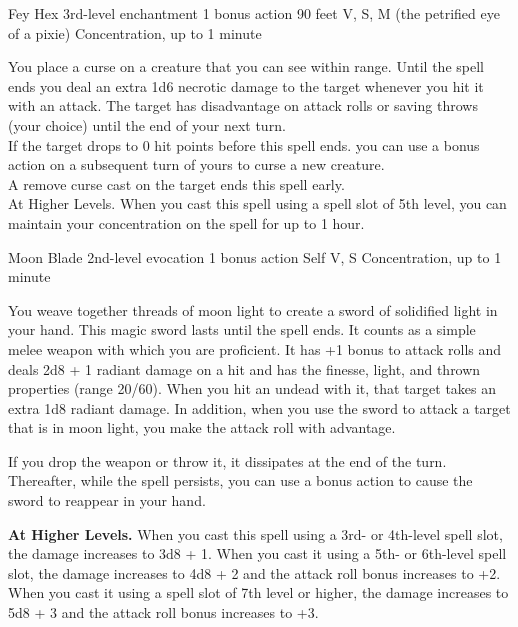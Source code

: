 \documentclass[letter,10pt,twocolumn,openany]{dndbook}
\begin{document}

\DndSpellHeader
  {Fey Hex}
  {3rd-level enchantment}
  {1 bonus action}
  {90 feet}
  {V, S, M (the petrified eye of a pixie)}
  {Concentration, up to 1 minute}

You place a curse on a creature that you can see within range. Until the spell ends you deal an extra 1d6 necrotic damage to the target whenever you hit it with an attack. The target has disadvantage on attack rolls or saving throws (your choice) until the end of your next turn.\\
If the target drops to 0 hit points before this spell ends. you can use a bonus action on a subsequent turn of yours to curse a new creature.\\
A remove curse cast on the target ends this spell early.\\
At Higher Levels. When you cast this spell using a spell slot of 5th level, you can maintain your concentration on the spell for up to 1 hour.

\DndSpellHeader
  {Moon Blade}
  {2nd-level evocation}
  {1 bonus action}
  {Self}
  {V, S}
  {Concentration, up to 1 minute}

You weave together threads of moon light to create a sword of solidified light in your hand. This magic sword lasts until the spell ends. It counts as a simple melee weapon with which you are proficient. It has +1 bonus to attack rolls and deals 2d8 + 1 radiant damage on a hit and has the finesse, light, and thrown properties (range 20/60). When you hit an undead with it, that target takes an extra 1d8 radiant damage. In addition, when you use the sword to attack a target that is in moon light, you make the attack roll with advantage.

If you drop the weapon or throw it, it dissipates at the end of the turn. Thereafter, while the spell persists, you can use a bonus action to cause the sword to reappear in your hand.

\textbf{At Higher Levels.} When you cast this spell using a 3rd- or 4th-level spell slot, the damage increases to 3d8 + 1. When you cast it using a 5th- or 6th-level spell slot, the damage increases to 4d8 + 2 and the attack roll bonus increases to +2. When you cast it using a spell slot of 7th level or higher, the damage increases to 5d8 + 3 and the attack roll bonus increases to +3.
\end{document}
